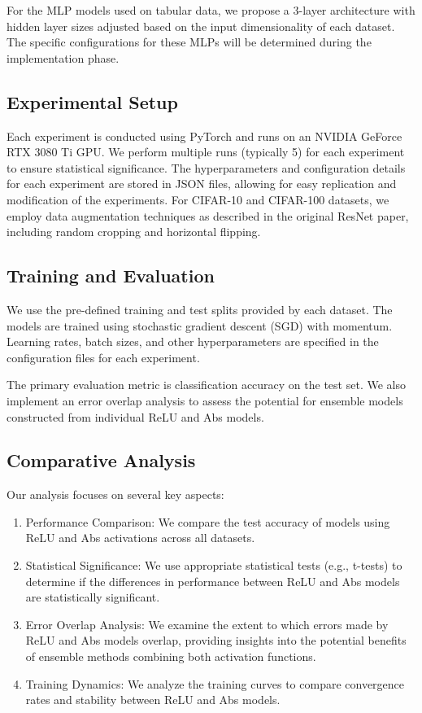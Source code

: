 \documentclass[11pt]{article}
\begin{document}
For the MLP models used on tabular data, we propose a 3-layer architecture with hidden layer sizes adjusted based on the input dimensionality of each dataset. The specific configurations for these MLPs will be determined during the implementation phase.

\subsection{Experimental Setup}

Each experiment is conducted using PyTorch and runs on an NVIDIA GeForce RTX 3080 Ti GPU. We perform multiple runs (typically 5) for each experiment to ensure statistical significance. The hyperparameters and configuration details for each experiment are stored in JSON files, allowing for easy replication and modification of the experiments.
For CIFAR-10 and CIFAR-100 datasets, we employ data augmentation techniques as described in the original ResNet paper, including random cropping and horizontal flipping.

\subsection{Training and Evaluation}

We use the pre-defined training and test splits provided by each dataset. The models are trained using stochastic gradient descent (SGD) with momentum. Learning rates, batch sizes, and other hyperparameters are specified in the configuration files for each experiment.

The primary evaluation metric is classification accuracy on the test set. We also implement an error overlap analysis to assess the potential for ensemble models constructed from individual ReLU and Abs models.

\subsection{Comparative Analysis}

Our analysis focuses on several key aspects:

\begin{enumerate}
\item Performance Comparison: We compare the test accuracy of models using ReLU and Abs activations across all datasets.
\item Statistical Significance: We use appropriate statistical tests (e.g., t-tests) to determine if the differences in performance between ReLU and Abs models are statistically significant.
\item Error Overlap Analysis: We examine the extent to which errors made by ReLU and Abs models overlap, providing insights into the potential benefits of ensemble methods combining both activation functions.
\item Training Dynamics: We analyze the training curves to compare convergence rates and stability between ReLU and Abs models.
\end{enumerate}
\end{document}
